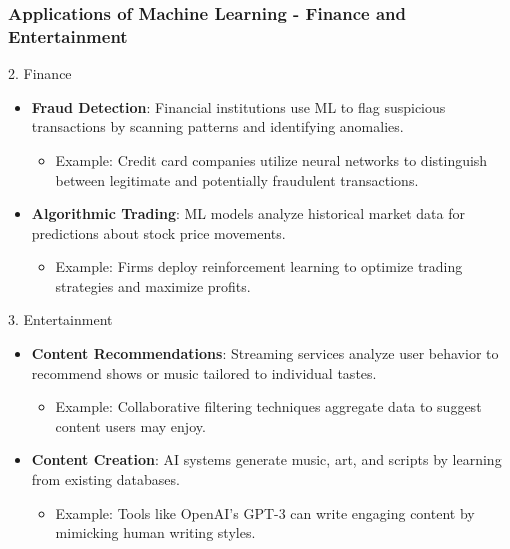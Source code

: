 \documentclass[aspectratio=169]{beamer}
\begin{document}
\begin{frame}[fragile]
  \frametitle{Applications of Machine Learning - Finance and Entertainment}
  \begin{block}{2. Finance}
    \begin{itemize}
      \item \textbf{Fraud Detection}: Financial institutions use ML to flag suspicious transactions by scanning patterns and identifying anomalies.
        \begin{itemize}
          \item Example: Credit card companies utilize neural networks to distinguish between legitimate and potentially fraudulent transactions.
        \end{itemize}
      \item \textbf{Algorithmic Trading}: ML models analyze historical market data for predictions about stock price movements.
        \begin{itemize}
          \item Example: Firms deploy reinforcement learning to optimize trading strategies and maximize profits.
        \end{itemize}
    \end{itemize}
  \end{block}

  \begin{block}{3. Entertainment}
    \begin{itemize}
      \item \textbf{Content Recommendations}: Streaming services analyze user behavior to recommend shows or music tailored to individual tastes.
        \begin{itemize}
          \item Example: Collaborative filtering techniques aggregate data to suggest content users may enjoy.
        \end{itemize}
      \item \textbf{Content Creation}: AI systems generate music, art, and scripts by learning from existing databases.
        \begin{itemize}
          \item Example: Tools like OpenAI’s GPT-3 can write engaging content by mimicking human writing styles.
        \end{itemize}
    \end{itemize}
  \end{block}
\end{frame}
\end{document}
